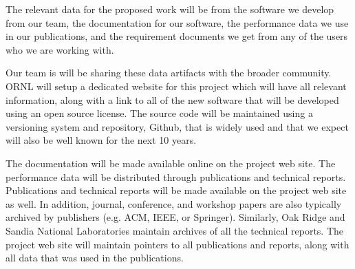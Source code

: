 
\vspace{1ex}
\noindent
The relevant data for the proposed work will be from the software we develop from our team, the documentation for our software, the performance data we use in our publications,
and the requirement documents we get from any of the users who we are working with.


Our team is  will be sharing these data artifacts with the broader community. ORNL will setup a dedicated website for this project which will have all relevant information, along with
a link to all of the new software that will be developed using an open source license.  The source code will be maintained using a versioning system and repository, Github, that is widely used and that we expect will also be well known for the next 10 years. 

The documentation will be made available online on the project web site. The performance data will be distributed through publications and technical reports. Publications and technical reports will be made available on the project web site as well. In addition, journal, conference, and workshop papers are also typically archived by publishers (e.g. ACM, IEEE, or Springer). Similarly, Oak Ridge and Sandia National Laboratories maintain archives of all the technical reports. The project web site will maintain pointers to all publications and reports, along with all data that was used in the publications.
